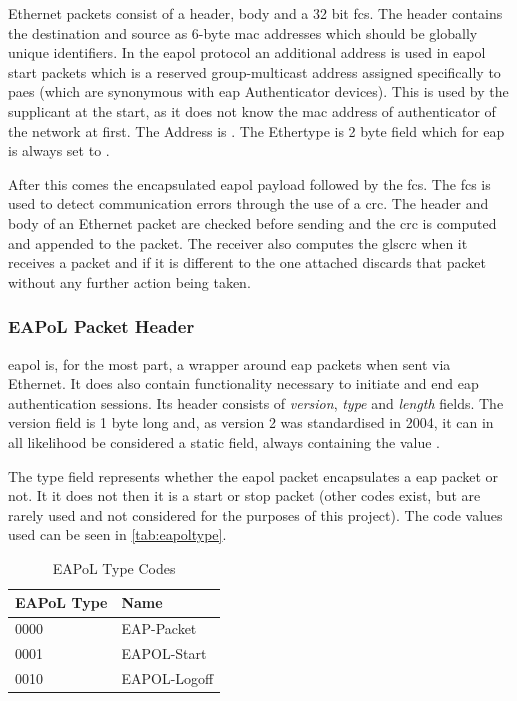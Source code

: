 Ethernet packets consist of a header, body and a 32 bit \gls{fcs}. The header
contains the destination and source as 6-byte \gls{mac} addresses which
should be globally unique identifiers. In the \gls{eapol} protocol an additional
address is used in \gls{eapol} start packets which is a reserved group-multicast
address assigned specifically to \glspl{pae} (which are synonymous with \gls{eap}
Authenticator devices). This is used by the supplicant at the start, as it does
not know the \gls{mac} address of authenticator of the network at first. The Address
is . The Ethertype is 2 byte field which for \gls{eap}
is always set to .

After this comes the encapsulated \gls{eapol} payload followed by the \gls{fcs}.
The \gls{fcs} is used to detect communication errors through the use of a \gls{crc}. The
header and body of an Ethernet packet are checked before sending and the \gls{crc}
is computed and appended to the packet. The receiver also computes the gls{crc}
when it receives a packet and if it is different to the one attached discards that packet
without any further action being taken.

\subsubsection{EAPoL Packet Header}

\Gls{eapol} is, for the most part, a wrapper around \gls{eap} packets when sent
via Ethernet. It does also contain functionality necessary to initiate and end \gls{eap}
authentication sessions.
Its header consists of \emph{version}, \emph{type} and \emph{length} fields.
The version field is 1 byte long and, as version 2 was standardised in 2004, it
can in all likelihood be considered a static field, always containing the value
.

The type field represents whether the \gls{eapol} packet encapsulates a \gls{eap}
packet or not. It it does not then it is a start or stop packet (other codes exist,
but are rarely used and not considered for the purposes of this project). The
code values used can be seen in \autoref{tab:eapoltype}.

\begin{table}
\begin{tabular}{ll}
\hline
EAPoL Type & Name  \\ \hline
0000 & EAP-Packet \\
0001 & EAPOL-Start \\
0010 & EAPOL-Logoff \\
\end{tabular}
\caption{EAPoL Type Codes}
\label{tab:eapoltype}
\end{table}


